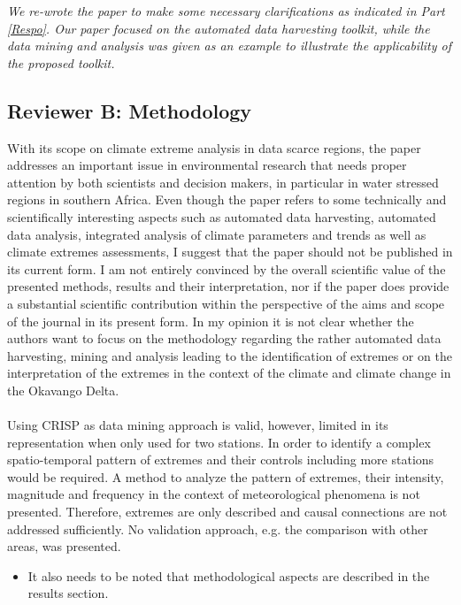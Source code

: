 \documentclass[a4paper, 12pt, conference]{ieeeconf}      %
\begin{document}
\emph{We re-wrote the paper to make some necessary clarifications as indicated in Part \ref{Respo}. Our paper focused on the   automated  data  harvesting toolkit, while the data mining  and  analysis was given as an example to illustrate the applicability of the proposed toolkit.}
	

	\subsection{\textbf{Reviewer B:} Methodology}
With its scope on climate extreme analysis in data scarce regions, the paper addresses an important issue in environmental research that needs proper attention by both scientists and decision makers, in particular in water stressed regions in southern Africa. Even though the paper refers to some technically and scientifically interesting aspects such as automated data harvesting, automated data analysis, integrated analysis of climate parameters and trends as well as climate extremes assessments, I suggest that the paper should not be published in its current form. I am not entirely convinced by the overall scientific value of the presented methods, results and their interpretation, nor if the paper does provide a substantial scientific contribution within the perspective of the aims and scope of the journal in its present form. In my opinion it is not clear whether the authors want to focus on the methodology regarding the rather automated data harvesting, mining and analysis leading to the identification of extremes or on the interpretation of the extremes in the context of the climate and climate change in the Okavango Delta.
	\\
	\\
	Using CRISP as data mining approach is valid, however, limited in its representation when only used for two stations. In order to identify a complex spatio-temporal pattern of extremes and their controls including more stations would be required. A method to analyze the pattern of extremes, their intensity, magnitude and frequency in the context of meteorological phenomena is not presented. Therefore, extremes are only described and causal connections are not addressed sufficiently. No validation approach, e.g. the comparison with other areas, was presented.\\
	   \begin{itemize}
       \item 	It also needs to be noted that methodological aspects are described in the results section.
   \end{itemize}
   
\end{document}
